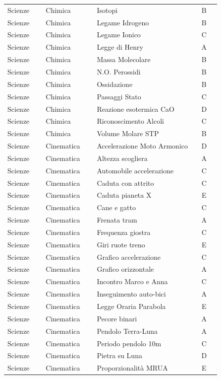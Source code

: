 \documentclass[20pt, a4paper]{article}
\begin{document}
\begin{longtable}{@{}>{\raggedright\arraybackslash}p{0.18\linewidth}>{\raggedright\arraybackslash}p{0.24\linewidth}>{\raggedright\arraybackslash}p{0.46\linewidth}c@{}}
Scienze & Chimica & Isotopi & B \\
Scienze & Chimica & Legame Idrogeno & B \\
Scienze & Chimica & Legame Ionico & C \\
Scienze & Chimica & Legge di Henry & A \\
Scienze & Chimica & Massa Molecolare & B \\
Scienze & Chimica & N.O. Perossidi & B \\
Scienze & Chimica & Ossidazione & B \\
Scienze & Chimica & Passaggi Stato & C \\
Scienze & Chimica & Reazione esotermica CaO & D \\
Scienze & Chimica & Riconoscimento Alcoli & C \\
Scienze & Chimica & Volume Molare STP & B \\
Scienze & Cinematica & Accelerazione Moto Armonico & D \\
Scienze & Cinematica & Altezza scogliera & A \\
Scienze & Cinematica & Automobile accelerazione & C \\
Scienze & Cinematica & Caduta con attrito & C \\
Scienze & Cinematica & Caduta pianeta X & E \\
Scienze & Cinematica & Cane e gatto & C \\
Scienze & Cinematica & Frenata tram & A \\
Scienze & Cinematica & Frequenza giostra & C \\
Scienze & Cinematica & Giri ruote treno & E \\
Scienze & Cinematica & Grafico accelerazione & C \\
Scienze & Cinematica & Grafico orizzontale & A \\
Scienze & Cinematica & Incontro Marco e Anna & C \\
Scienze & Cinematica & Inseguimento auto-bici & A \\
Scienze & Cinematica & Legge Oraria Parabola & E \\
Scienze & Cinematica & Pecore binari & A \\
Scienze & Cinematica & Pendolo Terra-Luna & A \\
Scienze & Cinematica & Periodo pendolo 10m & C \\
Scienze & Cinematica & Pietra su Luna & D \\
Scienze & Cinematica & Proporzionalità MRUA & E \\

\end{longtable}
\end{document}
